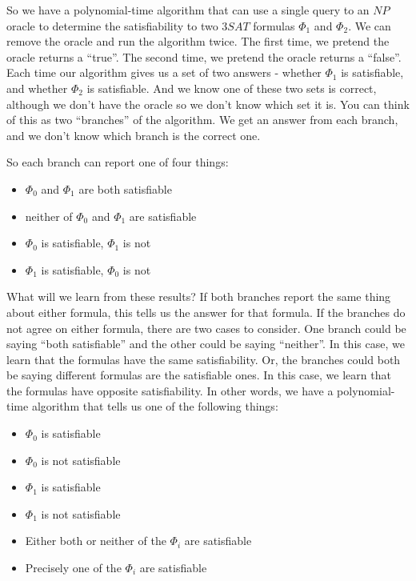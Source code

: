\documentclass{article}
\newenvironment{problem}[2][Problem]{\begin{trivlist}
\item[\hskip \labelsep {\bfseries #1}\hskip \labelsep {\bfseries #2.}]}{\end{trivlist}}
\begin{document}
\begin{problem}{6}
  So we have a polynomial-time algorithm that can use a single query to an $NP$
  oracle to determine the satisfiability to two $3SAT$ formulas
  $\Phi_1$ and $\Phi_2$. We can remove the oracle and run the
  algorithm twice. The first time, we pretend the oracle returns a
  ``true''. The second time, we pretend the oracle returns a
  ``false''. Each time our algorithm gives us a set of two answers -
  whether $\Phi_1$ is satisfiable, and whether $\Phi_2$ is
  satisfiable. And we know one of these two sets is correct, although
  we don't have the oracle so we don't know which set it is. You can
  think of this as two ``branches'' of the algorithm. We get an answer
  from each branch, and we don't know which branch is the correct one.

  So each branch can report one of four things:

  \begin{itemize}
  \item $\Phi_0$ and $\Phi_1$ are both satisfiable
  \item neither of $\Phi_0$ and $\Phi_1$ are satisfiable
  \item $\Phi_0$ is satisfiable, $\Phi_1$ is not
  \item $\Phi_1$ is satisfiable, $\Phi_0$ is not    
  \end{itemize}

  What will we learn from these results? If both branches report the
  same thing about either formula, this tells us the answer for that formula. If
  the branches do not agree on either formula, there are two
  cases to consider. One branch could be saying ``both satisfiable''
  and the other could be saying ``neither''. In this case, we learn
  that the formulas have the same satisfiability. Or, the branches
  could both be saying different formulas are the satisfiable ones. In
  this case, we learn that the formulas have opposite
  satisfiability. In other words, we have a polynomial-time algorithm
  that tells us one of the following things:

  \begin{itemize}
    \item $\Phi_0$ is satisfiable
    \item $\Phi_0$ is not satisfiable
    \item $\Phi_1$ is satisfiable
    \item $\Phi_1$ is not satisfiable
    \item Either both or neither of the $\Phi_i$ are satisfiable
    \item Precisely one of the $\Phi_i$ are satisfiable
  \end{itemize}


\end{problem}
\end{document}
